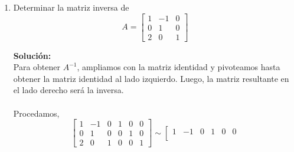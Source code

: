 \documentclass[12pt]{article}
\newenvironment{solucion}
{\begin{mdframed}[backgroundcolor=black!10]
		{\bf Solución:}\\
	}
	{
	\end{mdframed}
}
\newenvironment{preguntas}
{\begin{enumerate}\itemsep12pt
	}
	{
	\end{enumerate}
}
\begin{document}
\begin{preguntas}
\begin{solucion}
$$\begin{bmatrix}
		0 & 0 & 1
		\end{bmatrix}$$
		Finalmente,
		$$A = \begin{bmatrix}
		1 & 0 & 0\\
		-1 & 1 & 0\\
		0 & 0 & 1
		\end{bmatrix}\begin{bmatrix}
		1 & 0 & 0\\
		0 & 1 & 0\\
		0 & \frac{5}{2} & 1
		\end{bmatrix}\begin{bmatrix}
		1 & 0 & 0\\
		0 & 1 & 0\\
		0 & 0 & \frac{1}{16}
		\end{bmatrix}\begin{bmatrix}
		1 & 0 & 0\\
		0 & -\frac{1}{2} & 0\\
		0 & 0 & 1
		\end{bmatrix}\begin{bmatrix}
		1 & 0 & 0\\
		0 & 1 & 3\\
		0 & 0 & 1
		\end{bmatrix}\begin{bmatrix}
		1 & 0 & 6\\
		0 & 1 & 0\\
		0 & 0 & 1
		\end{bmatrix}$$
\end{solucion}
\item Determinar la matriz inversa de
$$A = \begin{bmatrix}
1 & -1 & 0 \\
0 & 1 & 0 \\
2 & 0 & 1
\end{bmatrix}$$
\begin{solucion}
Para obtener $A^{-1}$, ampliamos con la matriz identidad y pivoteamos hasta obtener la matriz identidad al lado izquierdo. Luego, la matriz resultante en el lado derecho será la inversa.\\
\\
Procedamos,
$$\left[
\begin{array}{ccc|ccc}
1 &-1 & 0 & 1 & 0 & 0 \\
0 & 1 & 0 & 0 & 1 & 0 \\
2 & 0 & 1 & 0 & 0 & 1
\end{array}
\right] \sim
\left[
\begin{array}{ccc|ccc}
1 &-1 & 0 & 1 & 0 & 0 \\

\end{array}$$
\end{solucion}
\end{preguntas}
\end{document}
